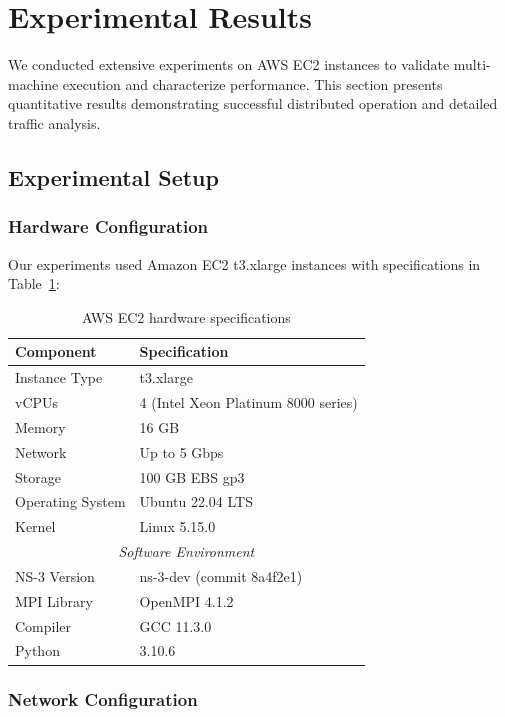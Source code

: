 \section{Experimental Results}
\label{sec:results}

We conducted extensive experiments on AWS EC2 instances to validate multi-machine execution and characterize performance. This section presents quantitative results demonstrating successful distributed operation and detailed traffic analysis.

\subsection{Experimental Setup}

\subsubsection{Hardware Configuration}

Our experiments used Amazon EC2 t3.xlarge instances with specifications in Table~\ref{tab:hardware-specs}:

\begin{table}[htbp]
\centering
\caption{AWS EC2 hardware specifications}
\label{tab:hardware-specs}
\begin{tabular}{@{}ll@{}}
\toprule
\textbf{Component} & \textbf{Specification} \\
\midrule
Instance Type & t3.xlarge \\
vCPUs & 4 (Intel Xeon Platinum 8000 series) \\
Memory & 16 GB \\
Network & Up to 5 Gbps \\
Storage & 100 GB EBS gp3 \\
Operating System & Ubuntu 22.04 LTS \\
Kernel & Linux 5.15.0 \\
\midrule
\multicolumn{2}{c}{\textit{Software Environment}} \\
\midrule
NS-3 Version & ns-3-dev (commit 8a4f2e1) \\
MPI Library & OpenMPI 4.1.2 \\
Compiler & GCC 11.3.0 \\
Python & 3.10.6 \\
\bottomrule
\end{tabular}
\end{table}

\subsubsection{Network Configuration}

